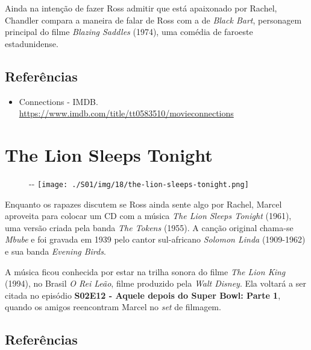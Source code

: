 Ainda na intenção de fazer Ross admitir que está apaixonado por Rachel,
Chandler compara a maneira de falar de Ross com a de \emph{Black Bart},
personagem principal do filme \emph{Blazing Saddles} (1974), uma comédia
de faroeste estadunidense.

\hypertarget{referuxeancias-6}{%
\subsection{Referências}\label{referuxeancias-6}}

\begin{itemize}
\tightlist
\item
  \sloppy Connections - IMDB. \url{https://www.imdb.com/title/tt0583510/movieconnections}
\end{itemize}

\hypertarget{the-lion-sleeps-tonight}{%
\section{The Lion Sleeps Tonight}\label{the-lion-sleeps-tonight}}

\begin{figure}[!ht]
  \begin{adjustwidth}{-\oddsidemargin-1in}{-\rightmargin}
    \centering
    \texttt{[image: ./S01/img/18/the-lion-sleeps-tonight.png]}
  \end{adjustwidth}
\end{figure}

Enquanto os rapazes discutem se Ross ainda sente algo por Rachel, Marcel
aproveita para colocar um CD com a música \emph{The Lion Sleeps Tonight}
(1961), uma versão criada pela banda \emph{The Tokens} (1955). A canção
original chama-se \emph{Mbube} e foi gravada em 1939 pelo cantor
sul-africano \emph{Solomon Linda} (1909-1962) e sua banda \emph{Evening
Birds}.

A música ficou conhecida por estar na trilha sonora do filme \emph{The
Lion King} (1994), no Brasil \emph{O Rei Leão}, filme produzido pela
\emph{Walt Disney}. Ela voltará a ser citada no episódio
\textbf{\textcolor{primarycolor}{S02E12 - Aquele depois do Super Bowl: Parte 1}},
quando os amigos reencontram Marcel no \emph{set} de filmagem.

\hypertarget{referuxeancias-7}{%
\subsection{Referências}\label{referuxeancias-7}}

